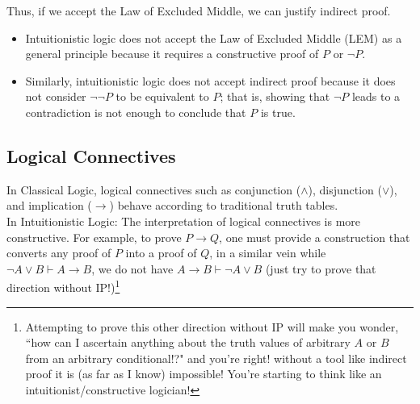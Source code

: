 
Thus, if we accept the Law of Excluded Middle, we can justify indirect proof.

\begin{itemize}
    \item Intuitionistic logic does not accept the Law of Excluded Middle (LEM) as a general principle because it requires a constructive proof of $ P $ or $ \neg P $.
    \item Similarly, intuitionistic logic does not accept indirect proof because it does not consider $ \neg \neg P $ to be equivalent to $ P $; that is, showing that $ \neg P $ leads to a contradiction is not enough to conclude that $ P $ is true.
\end{itemize}

\subsection{Logical Connectives}
In Classical Logic, logical connectives such as conjunction ($\wedge$), disjunction ($\lor$), and implication ($\rightarrow$) behave according to traditional truth tables. \\

\noindent In Intuitionistic Logic: The interpretation of logical connectives is more constructive. For example, to prove $P\rightarrow Q$, one must provide a construction that converts any proof of $P$ into a proof of $Q$, in a similar vein while $\neg A \lor B \vdash A\rightarrow B$, we do not have $A\rightarrow B \vdash \neg A \lor B$ (just try to prove that direction without IP!)\footnote{Attempting to prove this other direction without IP will make you wonder, ``how can I ascertain anything about the truth values of arbitrary $A$ or $B$ from an arbitrary conditional!?" and you're right! without a tool like indirect proof it is (as far as I know) impossible! You're starting to think like an intuitionist/constructive logician!}

